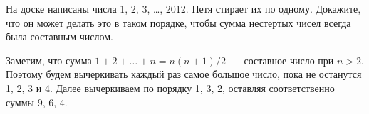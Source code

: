 \problem
На доске написаны числа 1, 2, 3, \ldots, 2012.
Петя стирает их по одному.
Докажите, что он может делать это в таком порядке, чтобы сумма нестертых чисел
всегда была составным числом.

\solution
Заметим, что сумма $1 + 2 + \ldots + n = n (n + 1) / 2$~--- составное число при
$n > 2$.
Поэтому будем вычеркивать каждый раз самое большое число, пока не останутся
1, 2, 3 и 4.
Далее вычеркиваем по порядку 1, 3, 2, оставляя соответственно суммы 9, 6, 4.

\endproblem
